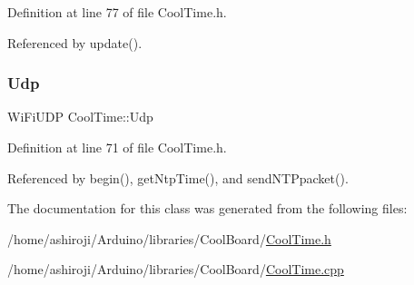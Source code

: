 Definition at line 77 of file Cool\+Time.\+h.



Referenced by update().

\mbox{\label{classCoolTime_a4e23216a8121ca79d0fb019f30884b92}} 
\subsubsection{\texorpdfstring{Udp}{Udp}}
{\footnotesize\ttfamily Wi\+Fi\+U\+DP Cool\+Time\+::\+Udp\hspace{0.3cm}{\ttfamily [private]}}



Definition at line 71 of file Cool\+Time.\+h.



Referenced by begin(), get\+Ntp\+Time(), and send\+N\+T\+Ppacket().



The documentation for this class was generated from the following files\+:\begin{DoxyCompactItemize}
\item 
/home/ashiroji/\+Arduino/libraries/\+Cool\+Board/\hyperlink{CoolTime_8h}{Cool\+Time.\+h}\item 
/home/ashiroji/\+Arduino/libraries/\+Cool\+Board/\hyperlink{CoolTime_8cpp}{Cool\+Time.\+cpp}\end{DoxyCompactItemize}
